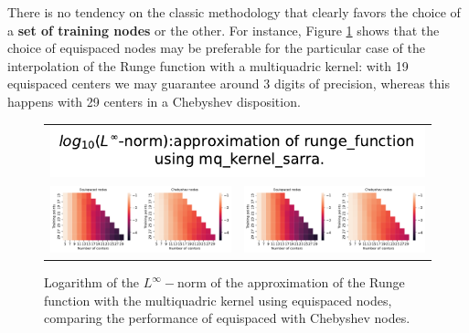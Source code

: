 \documentclass[12pt]{report} %
\begin{document}
There is no tendency on the classic methodology
that clearly favors the choice of a \textbf{set of training nodes} or the other. For instance,
Figure \ref{fig:runge-sarra-comparison-opt-points} shows that the choice of equispaced nodes may
be preferable for the particular case of the interpolation of the
Runge function with a multiquadric kernel: with 19 equispaced centers we may
guarantee around 3 digits of precision, whereas this happens with 29 centers
in a Chebyshev disposition.

\begin{figure}[h]
  \begin{tabular}{cc}
    \multicolumn{2}{c}{{\includegraphics[width=.5\textwidth]
    {imagenes/experiments/1d/variational/linf_runge_function_mq_kernel_sarra_Points_Classic_Title.pdf}}}                                                                                       \\
    {\includegraphics[height=.4\textwidth, trim={0 0 11.2cm 0},clip=true]
    {imagenes/experiments/1d/variational/linf_runge_function_mq_kernel_sarra_Points_Classic_Comparison.pdf}}  &
     {\includegraphics[height=.4\textwidth, trim={9.5cm 0 0 0},clip=true]{imagenes/experiments/1d/variational/linf_runge_function_mq_kernel_sarra_Points_Classic_Comparison.pdf}} \\
  \end{tabular}
  \caption{Logarithm of the $L^\infty-$norm of the approximation of the Runge function with the multiquadric kernel using equispaced nodes, comparing the performance of equispaced with Chebyshev nodes.}
  \label{fig:runge-sarra-comparison-opt-points}
\end{figure}
\end{document}
